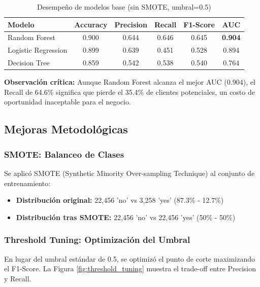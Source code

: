 \documentclass[12pt,letterpaper]{article}
\begin{document}
\begin{table}[H]
\centering
\caption{Desempeño de modelos base (sin SMOTE, umbral=0.5)}
\label{tab:modelos_base}
\begin{tabular}{@{}lccccc@{}}
\toprule
\textbf{Modelo} & \textbf{Accuracy} & \textbf{Precision} & \textbf{Recall} & \textbf{F1-Score} & \textbf{AUC} \\
\midrule
Random Forest & 0.900 & 0.644 & 0.646 & 0.645 & \textbf{0.904} \\
Logistic Regression & 0.899 & 0.639 & 0.451 & 0.528 & 0.894 \\
Decision Tree & 0.859 & 0.542 & 0.538 & 0.540 & 0.764 \\
\bottomrule
\end{tabular}
\end{table}

\textbf{Observación crítica:} Aunque Random Forest alcanza el mejor AUC (0.904), el Recall de 64.6\% significa que pierde el 35.4\% de clientes potenciales, un costo de oportunidad inaceptable para el negocio.

\subsection{Mejoras Metodológicas}

\subsubsection{SMOTE: Balanceo de Clases}

Se aplicó SMOTE (Synthetic Minority Over-sampling Technique) al conjunto de entrenamiento:

\begin{itemize}
    \item \textbf{Distribución original:} 22,456 'no' vs 3,258 'yes' (87.3\% - 12.7\%)
    \item \textbf{Distribución tras SMOTE:} 22,456 'no' vs 22,456 'yes' (50\% - 50\%)
\end{itemize}

\subsubsection{Threshold Tuning: Optimización del Umbral}

En lugar del umbral estándar de 0.5, se optimizó el punto de corte maximizando el F1-Score. La Figura \ref{fig:threshold_tuning} muestra el trade-off entre Precision y Recall.
\end{document}
